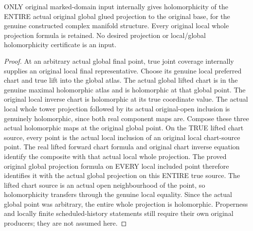 \begin{theorem}
\label{hir:original-input-global-terminal-whole-projection-holomorphic}
\leanok
{}
ONLY original marked-domain input internally gives holomorphicity of the
ENTIRE actual original global glued projection to the original base, for
the genuine constructed complex manifold structure. Every original local
whole projection formula is retained. No desired projection or local/global
holomorphicity certificate is an input.
\end{theorem}
\begin{proof}
At an arbitrary actual global final point, true joint coverage internally
supplies an original local final representative. Choose its genuine local
preferred chart and true lift into the global atlas. The actual global
lifted chart is in the genuine maximal holomorphic atlas and is holomorphic
at that global point. The original local inverse chart is holomorphic at
its true coordinate value. The actual local whole tower projection followed
by its actual original-open inclusion is genuinely holomorphic, since
both real component maps are. Compose these three actual holomorphic maps
at the original global point. On the TRUE lifted chart source, every point
is the actual local inclusion of an original local chart-source point.
The real lifted forward chart formula and original chart inverse equation
identify the composite with that actual local whole projection. The proved
original global projection formula on EVERY local included point therefore
identifies it with the actual global projection on this ENTIRE true source.
The lifted chart source is an actual open neighbourhood of the point, so
holomorphicity transfers through the genuine local equality. Since the
actual global point was arbitrary, the entire whole projection is
holomorphic. Properness and locally finite scheduled-history statements
still require their own original producers; they are not assumed here.
\end{proof}
